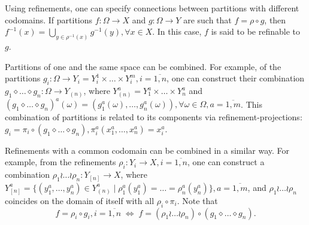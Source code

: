 Using refinements, one can specify connections between partitions with different codomains. If partitions $f : \Omega \rightarrow X$ and $g : \Omega \rightarrow Y$ are such that $f = \rho \circ g$, then $f^{-1}(x) = \bigcup_{y \in \rho^{-1}(x)} g^{-1}(y), \forall x \in X$. In this case, $f$ is said to be refinable to $g$. %

Partitions of one and the same space can be combined. For example, of the partitions $g_i : \Omega \rightarrow Y_i = Y_i^1 \times \ldots \times Y_i^m, i=\overline{1,n}$, one can construct their combination $g_1 \diamond \ldots \diamond g_n : \Omega \rightarrow Y_{(n)}$, where $Y_{(n)}^a = Y_1^a \times \ldots \times Y_n^a$ and $(g_1 \diamond \ldots \diamond g_n)^a(\omega) = (g_1^a(\omega), \ldots, g_n^a(\omega)), \forall \omega \in \Omega, a =\overline{1,m}$. This combination of partitions is related to its components via refinement-projections: $g_i  = \pi_i \circ (g_1 \diamond \ldots \diamond g_n), \pi_i^a(x_1^a, \ldots, x_n^a) = x_i^a$. %

Refinements with a common codomain can be combined in a similar way. For example, from the refinements $\rho_i : Y_i \rightarrow X, i=\overline{1,n}$, one can construct a combination $\rho_1 \wr \ldots \wr \rho_n : Y_{[n]} \rightarrow X$, where  $Y_{[n]}^a = \{(y_1^a, \ldots, y_n^a) \in Y_{(n)}^a \mid \rho_1^a(y_1^a) = \ldots = \rho_n^a(y_n^a)\}, a =\overline{1,m}$, and $\rho_1 \wr \ldots \wr \rho_n$ coincides on the domain of itself with all $\rho_i \circ \pi_i$. Note that %
\begin{equation*}
	f = \rho_i \circ g_i, i=\overline{1,n} \;\Leftrightarrow\; f = (\rho_1 \wr \ldots \wr \rho_n) \circ (g_1 \diamond \ldots \diamond g_n).
\end{equation*}

